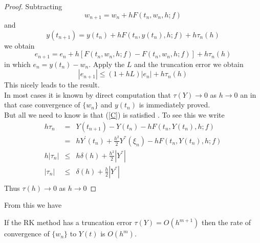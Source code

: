 \begin{proof}
Subtracting
\[ w_{n+1}=w_n +hF(t_n,w_n,h;f)\]
and
\[y( t_{n+1})=y(t_n) +hF(t_n,y(t_n),h;f)+h\tau_n(h)\]
we obtain
\[ e_{n+1}=e_n +h[F(t_n,w_n,h;f)-F(t_n,w_n,h;f)]+h\tau_n(h)\]
in which $e_n=y(t_n)-w_n$. Apply the  $L$ and the truncation
error we obtain
\[|e_{n+1}| \leq (1+hL)|e_n| + h \tau_n(h) \]
This nicely leads to the result.\\
In most cases it is known by direct computation that $\tau(Y) \rightarrow 0$ as $h \rightarrow 0$
an in that case convergence of $\{w_n \}$ and $y(t_n)$ is immediately proved.
\\
But all we need to know is that (\ref{C}) is satisfied .  To see this we write
\[\begin{array}{ccc}
h\tau_n &=& Y( t_{n+1})-Y(t_n) -hF(t_n,Y(t_n),h;f)\\
&=&hY^{'}(t_n)+\frac{h^{2}}{2}Y^{''}(\xi_n) -hF(t_n,Y(t_n),h;f)\\
h|\tau_n| &\leq& h\delta(h)+\frac{h^{2}}{2}|Y^{''}|\\
|\tau_n| &\leq& \delta(h)+\frac{h}{2}|Y^{''}|\\
\end{array}
\]
Thus $\tau(h) \rightarrow 0$ as $h \rightarrow 0$
\end{proof}
From this we have
\begin{corollary}
If the RK method has a truncation error $\tau(Y)=O(h^{m+1})$ then the rate of
convergence of $\{w_n\}$ to $Y(t)$ is $O(h^m)$.
\end{corollary}

